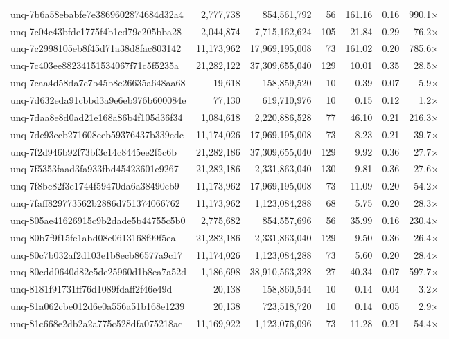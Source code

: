 \begin{table}[h!]
\begin{tabular}{lrrrrrr}
unq-7b6a58ebabfe7e3869602874684d32a4 & 2,777,738 & 854,561,792 & 56 & 161.16 & 0.16 & 990.1$\times$ \\
unq-7c04c43bfde1775f4b1cd79c205bba28 & 2,044,874 & 7,715,162,624 & 105 & 21.84 & 0.29 & 76.2$\times$ \\
unq-7c2998105eb8f45d71a38d8fac803142 & 11,173,962 & 17,969,195,008 & 73 & 161.02 & 0.20 & 785.6$\times$ \\
unq-7c403ee88234151534067f71c5f5235a & 21,282,122 & 37,309,655,040 & 129 & 10.01 & 0.35 & 28.5$\times$ \\
unq-7caa4d58da7c7b45b8c26635a648aa68 & 19,618 & 158,859,520 & 10 & 0.39 & 0.07 & 5.9$\times$ \\
unq-7d632eda91cbbd3a9e6eb976b600084e & 77,130 & 619,710,976 & 10 & 0.15 & 0.12 & 1.2$\times$ \\
unq-7daa8e8d0ad21e168a86b4f105d36f34 & 1,084,618 & 2,220,886,528 & 77 & 46.10 & 0.21 & 216.3$\times$ \\
unq-7de93ccb271608eeb59376437b339cdc & 11,174,026 & 17,969,195,008 & 73 & 8.23 & 0.21 & 39.7$\times$ \\
unq-7f2d946b92f73bf3c14c8445ee2f5c6b & 21,282,186 & 37,309,655,040 & 129 & 9.92 & 0.36 & 27.7$\times$ \\
unq-7f5353faad3fa933fbd45423601e9267 & 21,282,186 & 2,331,863,040 & 130 & 9.81 & 0.36 & 27.6$\times$ \\
unq-7f8bc82f3e1744f59470da6a38490eb9 & 11,173,962 & 17,969,195,008 & 73 & 11.09 & 0.20 & 54.2$\times$ \\
unq-7faff829773562b2886d751374066762 & 11,173,962 & 1,123,084,288 & 68 & 5.75 & 0.20 & 28.3$\times$ \\
unq-805ae41626915c9b2dade5b44755c5b0 & 2,775,682 & 854,557,696 & 56 & 35.99 & 0.16 & 230.4$\times$ \\
unq-80b7f9f15fe1abd08e0613168f99f5ea & 21,282,186 & 2,331,863,040 & 129 & 9.50 & 0.36 & 26.4$\times$ \\
unq-80c7b032af2d103e1b8ecb86577a9c17 & 11,174,026 & 1,123,084,288 & 73 & 5.60 & 0.20 & 28.4$\times$ \\
unq-80cdd0640d82e5de25960d1b8ea7a52d & 1,186,698 & 38,910,563,328 & 27 & 40.34 & 0.07 & 597.7$\times$ \\
unq-8181f91731ff76d1089fdaff2f46e49d & 20,138 & 158,860,544 & 10 & 0.14 & 0.04 & 3.2$\times$ \\
unq-81a062cbe012d6e0a556a51b168e1239 & 20,138 & 723,518,720 & 10 & 0.14 & 0.05 & 2.9$\times$ \\
unq-81c668e2db2a2a775c528dfa075218ac & 11,169,922 & 1,123,076,096 & 73 & 11.28 & 0.21 & 54.4$\times$ \\

\end{tabular}
\end{table}
